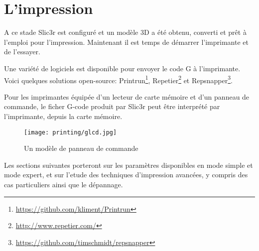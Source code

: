 
\section{L'impression} %
\label{sec:printing}

A ce stade Slic3r est configur\'e et un mod\`ele 3D a \'et\'e obtenu, converti et pr\^et \`a l'emploi pour l'impression. Maintenant il est temps de d\'emarrer l'imprimante et de l'essayer.

Une vari\'et\'e de logiciels est disponible pour envoyer le code G \`a l'imprimante. Voici quelques solutions open-source: Printrun\footnote{\url{https://github.com/kliment/Printrun}}, Repetier\footnote{\url{http://www.repetier.com/}} et Repsnapper\footnote{\url{https://github.com/timschmidt/repsnapper}}.

Pour les imprimantes \'equip\'ee d'un lecteur de carte m\'emoire et d'un panneau de commande, le ficher G-code produit par Slic3r peut \^etre interpr\'et\'e par l'imprimante, depuis la carte m\'emoire.
\begin{figure}[H]
\centering
\texttt{[image: printing/glcd.jpg]}
\caption{Un mod\`ele de panneau de commande}
\label{fig:glcd}
\end{figure}
Les sections suivantes porteront sur les param\`etres disponibles en mode simple et mode expert, et sur l'etude des techniques d'impression avanc\'ees, y compris des cas particuliers ainsi que le d\'epannage.

